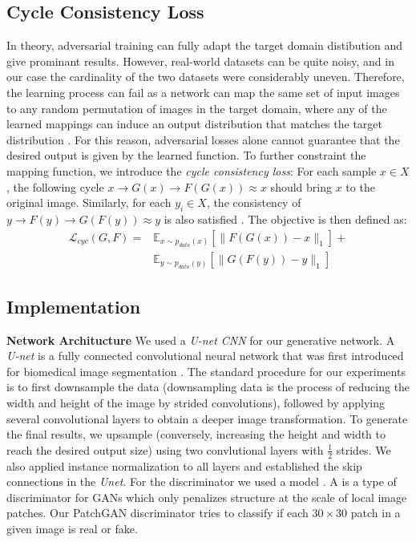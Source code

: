 \documentclass[10pt,twocolumn,letterpaper]{article}
\begin{document}
\subsection{Cycle Consistency Loss}
In theory, adversarial training can fully adapt the target domain distibution and give prominant results. However, real-world datasets can be quite noisy, and in our case the cardinality of the two datasets were considerably uneven. Therefore, the learning process can fail as a network can map the same set of input images to any random permutation of images in the target domain, where any of the learned mappings can induce an output distribution that matches the target distribution \cite{cyclegan}. For this reason, adversarial losses alone cannot guarantee that the desired output is given by the learned function. To further constraint the mapping function, we introduce the \emph{cycle consistency loss}: For each sample $x \in X$, the following cycle $x \rightarrow G(x)\rightarrow F(G(x)) \approx x$ should bring $x$ to the original image. Similarly, for each $y_{i}\in X$, the consistency of $y \rightarrow F(y)\rightarrow G(F(y)) \approx y$ is also satisfied \cite{cyclegan}. The objective is then defined as:
\begin{equation}
	\begin{split}
		\mathcal{L}_{cyc}(G,F) = & \mathbb{E}_{x \sim p_{data}(x)} [\| F(G(x))-x \| _1] + \\
				& \mathbb{E}_{y \sim p_{data}(y)} [\| G(F(y))-y \| _1]
	\end{split}
\end{equation}


\subsection{Implementation}
\textbf{Network Architucture} We used a \textit{U-net CNN} for our generative network. A \textit{U-net} is a fully connected convolutional neural network that was first introduced for biomedical image segmentation \cite{unet}. The standard procedure for our experiments is to first downsample the data (downsampling data is the process of reducing the width and height of the image by strided convolutions), followed by applying several convolutional layers to obtain a deeper image transformation. To generate the final results, we upsample (conversely, increasing the height and width to reach the desired output size) using two convlutional layers with $\frac{1}{2}$ strides. We also applied instance normalization \cite{insnorm} to all layers and established the skip connections in the \textit{Unet}. For the discriminator we used a  model \cite{patchgan}. A is a type of discriminator for GANs which only penalizes structure at the scale of local image patches. Our PatchGAN discriminator tries to classify if each $30 \times 30$ patch in a given image is real or fake.
\end{document}

